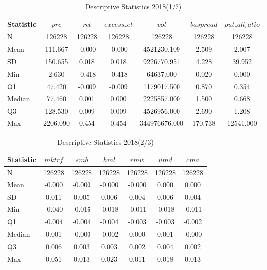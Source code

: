  \begin{table}[ht]
    \centering
    \caption{Descriptive Statistics 2018(1/3)}
    \label{tab:descr_stats_2018_1}
    
    \begin{tabular}{lcccccc}
    \toprule
    Statistic & $prc$ & $ret$ & $excess_ret$ & $vol$ & $baspread$ & $put_call_ratio$ \\\midrule
    N & 126228 & 126228 & 126228 & 126228 & 126228 & 126228 \\
    Mean & 111.667 & -0.000 & -0.000 & 4521230.109 & 2.509 & 2.007 \\
    SD & 150.655 & 0.018 & 0.018 & 9226770.951 & 4.228 & 39.952 \\
    Min & 2.630 & -0.418 & -0.418 & 64637.000 & 0.020 & 0.000 \\
    Q1 & 47.420 & -0.009 & -0.009 & 1179017.500 & 0.870 & 0.354 \\
    Median & 77.460 & 0.001 & 0.000 & 2225857.000 & 1.500 & 0.668 \\
    Q3 & 128.530 & 0.009 & 0.009 & 4526956.000 & 2.690 & 1.208 \\
    Max & 2206.090 & 0.454 & 0.454 & 344976676.000 & 170.738 & 12541.000 \\
    \bottomrule
    \end{tabular}
    \end{table}
    
    \begin{table}[ht]
    \centering
    \caption{Descriptive Statistics 2018(2/3)}
    \label{tab:descr_stats_2018_2}
    
    \begin{tabular}{lcccccc}
    \toprule
    Statistic & $mktrf$ & $smb$ & $hml$ & $rmw$ & $umd$ & $cma$ \\\midrule
    N & 126228 & 126228 & 126228 & 126228 & 126228 & 126228 \\
    Mean & -0.000 & -0.000 & -0.000 & -0.000 & 0.000 & 0.000 \\
    SD & 0.011 & 0.005 & 0.006 & 0.004 & 0.006 & 0.004 \\
    Min & -0.040 & -0.016 & -0.018 & -0.011 & -0.018 & -0.011 \\
    Q1 & -0.004 & -0.004 & -0.004 & -0.003 & -0.003 & -0.002 \\
    Median & 0.001 & -0.000 & -0.002 & 0.000 & 0.001 & -0.000 \\
    Q3 & 0.006 & 0.003 & 0.003 & 0.002 & 0.004 & 0.002 \\
    Max & 0.051 & 0.013 & 0.023 & 0.011 & 0.018 & 0.013 \\
    \bottomrule
    \end{tabular}
    \end{table}
    
